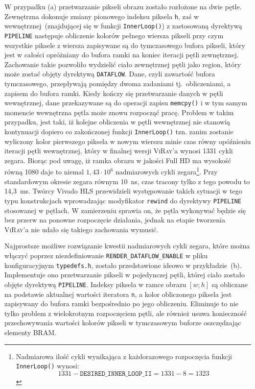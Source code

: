 \begin{enumerate}
\begin{enumerate}
\end{enumerate}
W przypadku (a) przetwarzanie pikseli obrazu zostało rozłożone na dwie pętle. Zewnętrzna dokonuje zmiany pionowego indeksu piksela \texttt{h}, zaś w wewnętrznej~(znajdującej się w funkcji \texttt{InnerLoop()}) z zastosowaną dyrektywą \texttt{PIPELINE} następuje obliczenie kolorów pełnego wiersza pikseli przy czym wszystkie piksele z wiersza zapisywane są do tymczasowego bufora pikseli, który jest w całości opróżniany do bufora ramki na koniec iteracji pętli zewnętrznej. Zachowanie takie pozwoliło wydzielić ciało zewnętrznej pętli jako region, który może zostać objęty dyrektywą \texttt{DATAFLOW}. Dane, czyli zawartość bufora tymczasowego, przepływają pomiędzy dwoma zadaniami tj.~obliczeniami, a zapisem do bufora ramki. Kiedy kończy się przetwarzanie danych w pętli wewnętrznej, dane przekazywane są do operacji zapisu \texttt{memcpy()} i w tym samym momencie wewnętrzna pętla może znowu rozpocząć pracę. Problem w takim przypadku, jest taki, iż kolejne obliczenia w pętli wewnętrznej nie stanowią kontynuacji dopiero co zakończonej funkcji \texttt{InnerLoop()} tzn. zanim zostanie wyliczony kolor pierwszego piksela w nowym wierszu minie czas równy opóźnieniu iteracji pętli wewnętrznej, który w finalnej wersji \textsc{ViRay}'a wynosi 1331 cykli zegara. Biorąc pod uwagę, iż ramka obrazu w jakości Full HD ma wysokość równą 1080 daje to niemal $1,43\cdot 10^6$ nadmiarowych cykli zegara\footnote{Nadmiarowa ilość cykli wynikająca z każdorazowego rozpoczęcia funkcji \texttt{InnerLoop()} wynosi: 
\begin{equation}
1331 - \mathtt{DESIRED\_INNER\_LOOP\_II} = 1331 - 8 = 1323
\end{equation}
}. Przy standardowym okresie zegara równym 10~ns, czas tracony tylko z tego powodu to 14,3~ms. Twórcy Vivado HLS przewidzieli występowanie takich sytuacji w tego typu konstrukcjach wprowadzając modyfikator \texttt{rewind} do dyrektywy \texttt{PIPELINE} stosowanej w pętlach. W zamierzeniu sprawia on, że pętla wykonywać będzie się bez przerw na ponowne rozpoczęcie działania, jednak na etapie tworzenia \textsc{ViRay}'a nie udało się takiego zachowania wymusić.

Najprostsze możliwe rozwiązanie kwestii nadmiarowych cykli zegara, które można włączyć poprzez niezdefiniowanie \texttt{RENDER\_DATAFLOW\_ENABLE} w pliku konfiguracyjnym \texttt{typedefs.h}, zostało przedstawione ideowo w przykładzie~(b). Implementuje ono przetwarzanie pikseli w pojedynczej pętli, której ciało zostało objęte dyrektywą \texttt{PIPELINE}. Indeksy piksela w ramce obrazu $[w;h]$ są obliczane na podstawie aktualnej wartości iteratora \texttt{n}, a kolor obliczonego piksela jest zapisywany do bufora ramki bezpośrednio po jego obliczeniu. Eliminuje to nie tylko problem z wielokrotnym rozpoczęciem pętli, ale również usuwa konieczność przechowywania wartości kolorów pikseli w tymczasowym buforze oszczędzając elementy BRAM. 


\end{enumerate}
